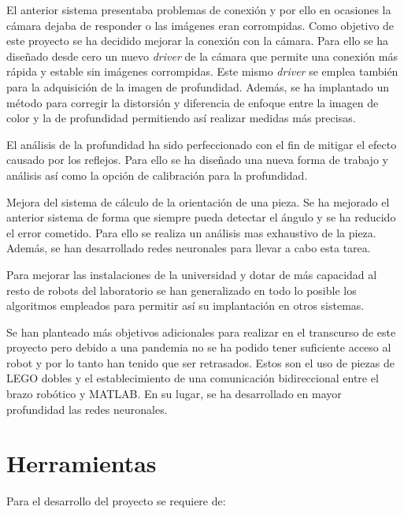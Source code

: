 El anterior sistema presentaba problemas de conexión y por ello en ocasiones la cámara dejaba de responder o las imágenes eran corrompidas. Como objetivo de este proyecto se ha decidido mejorar la conexión con la cámara. Para ello se ha diseñado desde cero un nuevo \textit{driver} de la cámara que permite una conexión más rápida y estable sin imágenes corrompidas. Este mismo \textit{driver} se emplea también para la adquisición de la imagen de profundidad. Además, se ha implantado un método para corregir la distorsión y diferencia de enfoque entre la imagen de color y la de profundidad permitiendo así realizar medidas más precisas.

El análisis de la profundidad ha sido perfeccionado con el fin de mitigar el efecto causado por los reflejos. Para ello se ha diseñado una nueva forma de trabajo y análisis así como la opción de calibración para la profundidad.

Mejora del sistema de cálculo de la orientación de una pieza. Se ha mejorado el anterior sistema de forma que siempre pueda detectar el ángulo y se ha reducido el error cometido. Para ello se realiza un análisis mas exhaustivo de la pieza. Además, se han desarrollado redes neuronales para llevar a cabo esta tarea.

Para mejorar las instalaciones de la universidad y dotar de más capacidad al resto de robots del laboratorio se han generalizado en todo lo posible los algoritmos empleados para permitir así su implantación en otros sistemas.

Se han planteado más objetivos adicionales para realizar en el transcurso de este proyecto pero debido a una pandemia no se ha podido tener suficiente acceso al robot y por lo tanto han tenido que ser retrasados. Estos son el uso de piezas de LEGO dobles y el establecimiento de una comunicación bidireccional entre el brazo robótico y MATLAB. En su lugar, se ha desarrollado en mayor profundidad las redes neuronales.

\section{Herramientas}
\label{sec:Herramientas}
Para el desarrollo del proyecto se requiere de:

